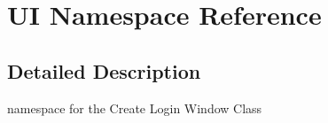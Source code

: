 \hypertarget{namespace_u_i}{}\section{UI Namespace Reference}
\label{namespace_u_i}


\subsection{Detailed Description}
namespace for the Create Login Window Class